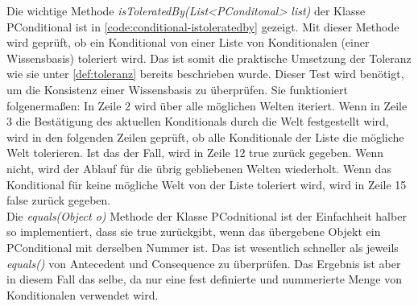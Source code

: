 \documentclass[12pt,a4paper]{article}
\begin{document}
Die wichtige Methode \textit{isToleratedBy(List<PConditonal> list)} der Klasse PConditional ist in \autoref{code:conditional-istoleratedby} gezeigt. Mit dieser Methode wird geprüft, ob ein Konditional von einer Liste von Konditionalen (einer Wissensbasis) toleriert wird. Das ist somit die praktische Umsetzung der Toleranz wie sie unter \autoref{def:toleranz} bereits beschrieben wurde. Dieser Test wird benötigt, um die Konsistenz einer Wissensbasis zu überprüfen. Sie funktioniert folgenermaßen: In Zeile 2 wird über alle möglichen Welten iteriert. Wenn in Zeile 3 die Bestätigung des aktuellen Konditionals durch die Welt festgestellt wird, wird in den folgenden Zeilen geprüft, ob alle Konditionale der Liste die mögliche Welt tolerieren. Ist das der Fall, wird in Zeile 12 true zurück gegeben. Wenn nicht, wird der Ablauf für die übrig gebliebenen Welten wiederholt. Wenn das Konditional für keine mögliche Welt von der Liste toleriert wird, wird in Zeile 15 false zurück gegeben. \\
Die \textit{equals(Object o)} Methode der Klasse PCodnitional ist der Einfachheit halber so implementiert, dass sie true zurückgibt, wenn das übergebene Objekt ein PConditional mit derselben Nummer ist. Das ist wesentlich schneller als jeweils \textit{equals()} von Antecedent und Consequence zu überprüfen. Das Ergebnis ist aber in diesem Fall das selbe, da nur eine fest definierte und nummerierte Menge von Konditionalen verwendet wird.
\end{document}
